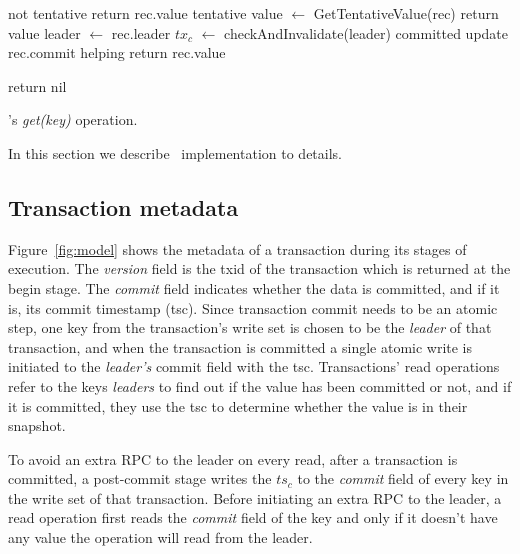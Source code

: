 \begin{algorithm}[htb]
  \begin{algorithmic}
    \begin{small}
       \Comment not tentative
        \State return rec.value \EndIf
      \Else \Comment tentative
      \State value $\leftarrow$ {\sc GetTentativeValue(rec)}
	  \State return value
      \EndIf
      \EndIf
      \EndFor
      \EndProcedure
      \Statex
      \State leader $\leftarrow$ rec.leader
      \State $tx_c$ $\leftarrow$ checkAndInvalidate(leader)
       \Comment  committed
      \State update rec.commit \Comment helping 
        return rec.value \EndIf
      \Else

      \State  return nil
      \EndIf
      \EndProcedure
    \end{small}
  \end{algorithmic}
  \caption{\sys's \emph{get(key)} operation.} 
  \label{fig:get-pseudocode}
\end{algorithm} 



In this section we describe \sys\ implementation to details.
\subsection{Transaction metadata}
\label{ssec:tso}
Figure~\ref{fig:model} shows the metadata of a transaction during its stages of execution. The \emph{version} field  is the txid of the transaction which is returned at the begin stage. The \emph{commit} field indicates whether the data is committed, and if it is, its commit timestamp (tsc). Since transaction commit needs to be an atomic step, one key from the transaction's write set is chosen to be the \emph{leader} of that transaction, and when the transaction is committed a single atomic write is initiated to the \emph{leader's} commit field with the tsc. Transactions' read operations refer to the keys \emph{leaders} to find out if the value has been committed or not, and if it is committed, they use the tsc to determine whether the value is in their snapshot.

To avoid an extra RPC to the leader on every read, after a transaction is committed, a post-commit stage writes the $ts_c$ to the \emph{commit} field of every key in the write set of that transaction. Before initiating an extra RPC to the leader, a read operation first reads the \emph{commit} field of the key and only if it doesn't have any value the operation will read from the leader.


